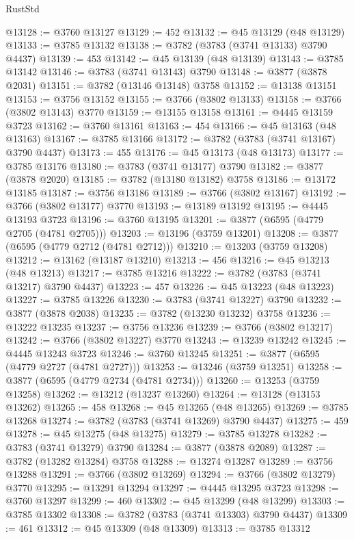 \begin{lexlean}{RustStd}
\begin{coremodule}
@13128 := @3760 @13127
@13129 := 452
@13132 := @45 @13129 (@48 @13129)
@13133 := @3785 @13132
@13138 := @3782 (@3783 (@3741 @13133) @3790 @4437)
@13139 := 453
@13142 := @45 @13139 (@48 @13139)
@13143 := @3785 @13142
@13146 := @3783 (@3741 @13143) @3790
@13148 := @3877 (@3878 @2031)
@13151 := @3782 (@13146 @13148) @3758
@13152 := @13138 @13151
@13153 := @3756 @13152
@13155 := @3766 (@3802 @13133)
@13158 := @3766 (@3802 @13143) @3770
@13159 := @13155 @13158
@13161 := @4445 @13159 @3723
@13162 := @3760 @13161
@13163 := 454
@13166 := @45 @13163 (@48 @13163)
@13167 := @3785 @13166
@13172 := @3782 (@3783 (@3741 @13167) @3790 @4437)
@13173 := 455
@13176 := @45 @13173 (@48 @13173)
@13177 := @3785 @13176
@13180 := @3783 (@3741 @13177) @3790
@13182 := @3877 (@3878 @2020)
@13185 := @3782 (@13180 @13182) @3758
@13186 := @13172 @13185
@13187 := @3756 @13186
@13189 := @3766 (@3802 @13167)
@13192 := @3766 (@3802 @13177) @3770
@13193 := @13189 @13192
@13195 := @4445 @13193 @3723
@13196 := @3760 @13195
@13201 := @3877 (@6595 (@4779 @2705 (@4781 @2705)))
@13203 := @13196 (@3759 @13201)
@13208 := @3877 (@6595 (@4779 @2712 (@4781 @2712)))
@13210 := @13203 (@3759 @13208)
@13212 := @13162 (@13187 @13210)
@13213 := 456
@13216 := @45 @13213 (@48 @13213)
@13217 := @3785 @13216
@13222 := @3782 (@3783 (@3741 @13217) @3790 @4437)
@13223 := 457
@13226 := @45 @13223 (@48 @13223)
@13227 := @3785 @13226
@13230 := @3783 (@3741 @13227) @3790
@13232 := @3877 (@3878 @2038)
@13235 := @3782 (@13230 @13232) @3758
@13236 := @13222 @13235
@13237 := @3756 @13236
@13239 := @3766 (@3802 @13217)
@13242 := @3766 (@3802 @13227) @3770
@13243 := @13239 @13242
@13245 := @4445 @13243 @3723
@13246 := @3760 @13245
@13251 := @3877 (@6595 (@4779 @2727 (@4781 @2727)))
@13253 := @13246 (@3759 @13251)
@13258 := @3877 (@6595 (@4779 @2734 (@4781 @2734)))
@13260 := @13253 (@3759 @13258)
@13262 := @13212 (@13237 @13260)
@13264 := @13128 (@13153 @13262)
@13265 := 458
@13268 := @45 @13265 (@48 @13265)
@13269 := @3785 @13268
@13274 := @3782 (@3783 (@3741 @13269) @3790 @4437)
@13275 := 459
@13278 := @45 @13275 (@48 @13275)
@13279 := @3785 @13278
@13282 := @3783 (@3741 @13279) @3790
@13284 := @3877 (@3878 @2089)
@13287 := @3782 (@13282 @13284) @3758
@13288 := @13274 @13287
@13289 := @3756 @13288
@13291 := @3766 (@3802 @13269)
@13294 := @3766 (@3802 @13279) @3770
@13295 := @13291 @13294
@13297 := @4445 @13295 @3723
@13298 := @3760 @13297
@13299 := 460
@13302 := @45 @13299 (@48 @13299)
@13303 := @3785 @13302
@13308 := @3782 (@3783 (@3741 @13303) @3790 @4437)
@13309 := 461
@13312 := @45 @13309 (@48 @13309)
@13313 := @3785 @13312

\end{coremodule}
\end{lexlean}
